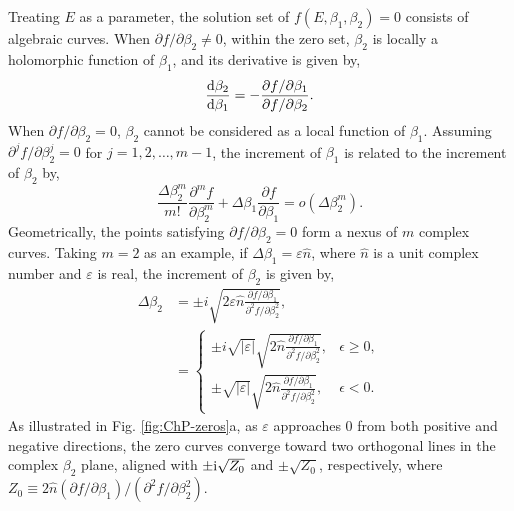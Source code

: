 Treating $E$ as a parameter, the solution set of $f(E,\beta_{1},\beta_{2})=0$
consists of algebraic curves. When $\partial f/\partial\beta_{2}\neq0$,
within the zero set, $\beta_{2}$ is locally a holomorphic function
of $\beta_{1}$, and its derivative is given by, 
\begin{equation}
\frac{\mathrm{d}\beta_{2}}{\mathrm{d}\beta_{1}}=-\frac{\partial f/\partial\beta_{1}}{\partial f/\partial\beta_{2}}.
\end{equation}
When $\partial f/\partial\beta_{2}=0$, $\beta_{2}$ cannot be considered
as a local function of $\beta_{1}$. Assuming $\partial^{j}f/\partial\beta_{2}^{j}=0$
for $j=1,2,\dots,m-1$, the increment of $\beta_{1}$ is related to
the increment of $\beta_{2}$ by, 
\begin{equation}
\frac{\Delta\beta_{2}^{m}}{m!}\frac{\partial^{m}f}{\partial\beta_{2}^{m}}+\Delta\beta_{1}\frac{\partial f}{\partial\beta_{1}}=o\left(\Delta\beta_{2}^{m}\right).
\end{equation}
Geometrically, the points satisfying $\partial f/\partial\beta_{2}=0$
form a nexus of $m$ complex curves. Taking $m=2$ as an example,
if $\Delta\beta_{1}=\varepsilon\hat{n}$, where $\hat{n}$ is a unit
complex number and $\varepsilon$ is real, the increment of $\beta_{2}$
is given by, 
\begin{align*}
\Delta\beta_{2} & =\pm i\sqrt{2\varepsilon\hat{n}\frac{\partial f/\partial\beta_{1}}{\partial^{2}f/\partial\beta_{2}^{2}}},\\
 & =\begin{cases}
\pm i\sqrt{\left|\varepsilon\right|}\sqrt{2\hat{n}\frac{\partial f/\partial\beta_{1}}{\partial^{2}f/\partial\beta_{2}^{2}}}, & \epsilon\geq0,\\
\pm\sqrt{\left|\varepsilon\right|}\sqrt{2\hat{n}\frac{\partial f/\partial\beta_{1}}{\partial^{2}f/\partial\beta_{2}^{2}}}, & \epsilon<0.
\end{cases}
\end{align*}
As illustrated in Fig. \ref{fig:ChP-zeros}a, as $\varepsilon$ approaches
$0$ from both positive and negative directions, the zero curves converge
toward two orthogonal lines in the complex $\beta_{2}$ plane, aligned
with $\pm\mathrm{i}\sqrt{Z_{0}}$ and $\pm\sqrt{Z_{0}}$, respectively,
where $Z_{0}\equiv2\hat{n}\left(\partial f/\partial\beta_{1}\right)/\left(\partial^{2}f/\partial\beta_{2}^{2}\right)$.

